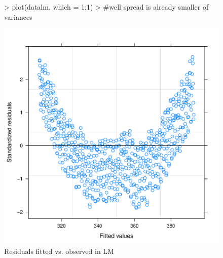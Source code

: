\documentclass[11pt, a4paper]{article} %
\begin{document}
\begin{figure}[H]
\centering
\begin{Schunk}
\begin{Sinput}
> plot(datalm, which = 1:1)
> #well spread is already smaller of variances
\end{Sinput}
\end{Schunk}
\includegraphics{alleselena-residual}
\caption{Residuals fitted vs. observed in LM}
\label{residual}
\end{figure}\\
\end{document}
